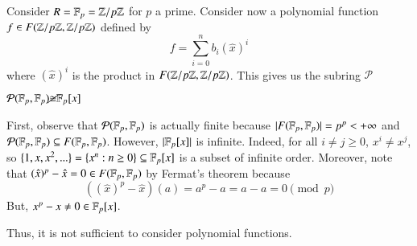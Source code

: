 \documentclass[12pt, a4paper, twoside, openright, titlepage]{book}
\begin{document}
\begin{eg}{}{}
    Consider $R = \mathbb F_p = \mathbb Z/p\mathbb Z$ for $p$ a prime. Consider now a polynomial function $f \in F(\mathbb Z/p\mathbb Z,\mathbb Z/p\mathbb Z)$ defined by $$f = \sum\limits_{i=0}^nb_i(\hat{x})^i$$ where $(\hat{x})^i$ is the product in $F(\mathbb Z/p\mathbb Z, \mathbb Z/p\mathbb Z)$. This gives us the subring $\mathcal{P}$
    \begin{claim}{}{}
        $\mathcal{P}(\mathbb F_p,\mathbb F_p) \cancel{\cong} \mathbb F_p[x]$
        \begin{proof*}{}{}
            First, observe that $\mathcal{P}(\mathbb F_p,\mathbb F_p)$ is actually finite because $|F(\mathbb F_p,\mathbb F_p)| = p^p < +\infty$ and $\mathcal{P}(\mathbb F_p,\mathbb F_p) \subseteq F(\mathbb F_p,\mathbb F_p)$. However, $|\mathbb F_p[x]|$ is infinite. Indeed, for all $i \neq j\geq 0$, $x^i \neq x^j$, so $\{1,x,x^2,...\} = \{x^n:n\geq 0\} \subseteq \mathbb F_p[x]$ is a subset of infinite order. Moreover, note that $(\hat{x})^p - \hat{x} = 0 \in F(\mathbb F_p,\mathbb F_p)$ by Fermat's theorem because $$((\hat{x})^p - \hat{x})(a) = a^p-a = a-a = 0 \pmod{p}$$
            But, $x^p - x \neq 0 \in \mathbb F_p[x]$.
        \end{proof*}
    \end{claim}
    Thus, it is not sufficient to consider polynomial functions.
\end{eg} 
\end{document}
